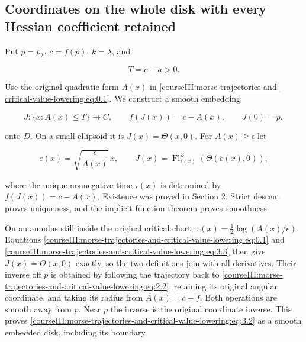 \subsection{Coordinates on the whole disk with every Hessian coefficient retained}
\label{courseIII:morse-trajectories-and-critical-value-lowering:trajectory-disk-coordinates}

\label{courseIII:morse-trajectories-and-critical-value-lowering:section-3}\label{courseIII:trajectory-lowering:3}

Put \(p=p_\lambda\), \(c=f(p)\), \(k=\lambda\), and

\begin{equation}
T=c-a>0.
 \label{courseIII:morse-trajectories-and-critical-value-lowering:eq:3.1}
\end{equation}

Use the original quadratic form \(A(x)\) in \eqref{courseIII:morse-trajectories-and-critical-value-lowering:eq:0.1}. We construct a smooth embedding

\begin{equation}
J:\{x:A(x)\leq T\}\longrightarrow C,\qquad
 f(J(x))=c-A(x),\qquad J(0)=p,
 \label{courseIII:morse-trajectories-and-critical-value-lowering:eq:3.2}
\end{equation}

onto \(D\). On a small ellipsoid it is \(J(x)=\Theta(x,0)\). For \(A(x)\geq\epsilon\) let

\begin{equation}
e(x)=\sqrt{\frac{\epsilon}{A(x)}}\,x,\qquad
 J(x)=\operatorname{Fl}^{Z}_{\tau(x)}(\Theta(e(x),0)),
 \label{courseIII:morse-trajectories-and-critical-value-lowering:eq:3.3}
\end{equation}

where the unique nonnegative time \(\tau(x)\) is determined by \(f(J(x))=c-A(x)\). Existence was proved in Section 2. Strict descent proves uniqueness, and the implicit function theorem proves smoothness.

On an annulus still inside the original critical chart,
\(\tau(x)=\tfrac12\log(A(x)/\epsilon)\). Equations \eqref{courseIII:morse-trajectories-and-critical-value-lowering:eq:0.1} and \eqref{courseIII:morse-trajectories-and-critical-value-lowering:eq:3.3} then give \(J(x)=\Theta(x,0)\) exactly, so the two definitions join with all derivatives. Their inverse off \(p\) is obtained by following the trajectory back to \eqref{courseIII:morse-trajectories-and-critical-value-lowering:eq:2.2}, retaining its original angular coordinate, and taking its radius from \(A(x)=c-f\). Both operations are smooth away from \(p\). Near \(p\) the inverse is the original coordinate inverse. This proves \eqref{courseIII:morse-trajectories-and-critical-value-lowering:eq:3.2} as a smooth embedded disk, including its boundary.

